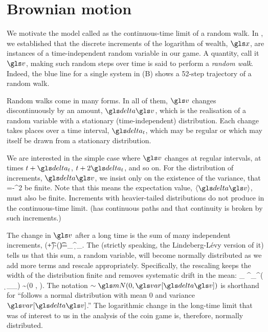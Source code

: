 
\section{Brownian motion}
We motivate the model called \BM as the continuous-time limit of a random walk. In , we established that the discrete increments of the logarithm of wealth, $\x$, are instances of a time-independent random variable in our game. A quantity, call it $\gv$, making such random steps over time is said to perform a \textit{random walk}. Indeed, the blue line for a single system in  (B) shows a 52-step trajectory of a random walk.

Random walks come in many forms. In all of them, $\gv$ changes discontinuously by an amount, $\d\gv$, which is the realisation of a random variable with a stationary (\ie time-independent) distribution. Each change takes places over a time interval, $\dt$, which may be regular or which may itself be drawn from a stationary distribution.

We are interested in the simple case where $\gv$ changes at regular intervals, \ie at times $t+\dt$, $t+2\dt$, and so on. For the distribution of increments, $\d\gv$, we insist only on the existence of the variance, \ie that 
\be
\var[\d \gv]=-\ave{\d \gv}^2
\ee
be finite. Note that this means the expectation value, $\ave{\d\gv}$, must also be finite. Increments with heavier-tailed distributions do not produce \BM in the continuous-time limit. (\BM has continuous paths and that continuity is broken by such increments.)

The change in $\gv$ after a long time is the sum of many independent increments, 
\be
\gv(\t+\T\dt)-\gv(\t)=\sum_{}^\T \d\gv_\gtau.
\ee
The \CLT (strictly speaking, the Lindeberg-L\'{e}vy version of it) tells us that this sum, a random variable, will become normally distributed as we add more terms and rescale appropriately. Specifically, the rescaling keeps the width of the distribution finite and removes systematic drift in the mean:
\be
\lim_{\T\to\infty} ^{}\sum_{}^\T ( \d \gv_\gtau \underbrace{-\ave{\d \gv}}_{}) \sim \mN(0 , \var[\d \gv]).
\ee
The notation $\sim \mN(0, \var[\d \gv])$ is shorthand for ``follows a normal distribution with mean $0$ and variance $\var[\d \gv]$.'' The logarithmic change in the long-time limit that was of interest to us in the analysis of the coin game is, therefore, normally distributed. 

